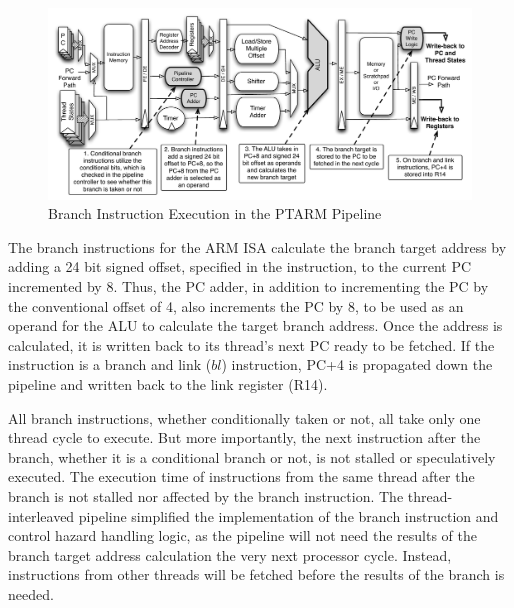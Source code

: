 \begin{figure}
  \vspace{-20pt}
  \begin{center}
    \includegraphics[scale=.54]{figs/branch_pipeline_implementation}
  \end{center}
  \vspace{-20pt}
  \caption{Branch Instruction Execution in the PTARM Pipeline}
  \label{fig:branch_pipeline_implementation}
\end{figure}

The branch instructions for the ARM ISA calculate the branch target address by adding a 24 bit signed offset, specified in the instruction, to the current PC incremented by 8. 
Thus, the PC adder, in addition to incrementing the PC by the conventional offset of 4, also increments the PC by 8, to be used as an operand for the ALU to calculate the target branch address.
Once the address is calculated, it is written back to its thread's next PC ready to be fetched. 
If the instruction is a branch and link ($bl$) instruction, PC+4 is propagated down the pipeline and written back to the link register (R14).   

All branch instructions, whether conditionally taken or not, all take only one thread cycle to execute.
But more importantly, the next instruction after the branch, whether it is a conditional branch or not, is not stalled or speculatively executed. 
The execution time of instructions from the same thread after the branch is not stalled nor affected by the branch instruction.  
The thread-interleaved pipeline simplified the implementation of the branch instruction and control hazard handling logic, as the pipeline will not need the results of the branch target address calculation the very next processor cycle.  
Instead, instructions from other threads will be fetched before the results of the branch is needed.

